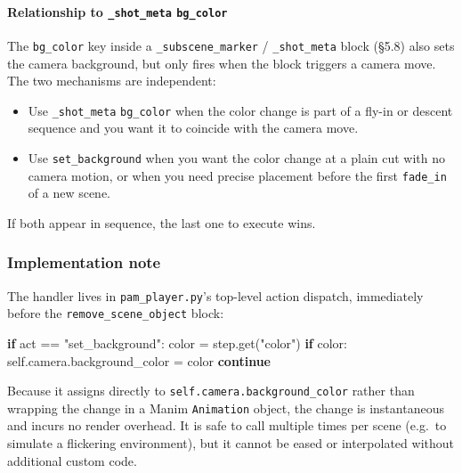 \documentclass[
  12pt,
  letterpaper,
]{book}
\newenvironment{Shaded}{}{}
\newcommand{\BuiltInTok}[1]{\textcolor[rgb]{0.00,0.50,0.00}{#1}}
\newcommand{\ControlFlowTok}[1]{\textcolor[rgb]{0.00,0.44,0.13}{\textbf{#1}}}
\newcommand{\NormalTok}[1]{#1}
\newcommand{\OperatorTok}[1]{\textcolor[rgb]{0.40,0.40,0.40}{#1}}
\newcommand{\StringTok}[1]{\textcolor[rgb]{0.25,0.44,0.63}{#1}}
\providecommand{\tightlist}{%
  \setlength{\itemsep}{0pt}\setlength{\parskip}{0pt}}
\begin{document}
\paragraph{Relationship to \texttt{\_shot\_meta}
\texttt{bg\_color}}\label{set-background-vs-shot-meta}

The \texttt{bg\_color} key inside a \texttt{\_subscene\_marker} /
\texttt{\_shot\_meta} block (§5.8) also sets the camera background,
but only fires when the block triggers a camera move. The two
mechanisms are independent:

\begin{itemize}
\tightlist
\item
  Use \texttt{\_shot\_meta} \texttt{bg\_color} when the color change
  is part of a fly-in or descent sequence and you want it to coincide
  with the camera move.
\item
  Use \texttt{set\_background} when you want the color change at a
  plain cut with no camera motion, or when you need precise placement
  before the first \texttt{fade\_in} of a new scene.
\end{itemize}

If both appear in sequence, the last one to execute wins.

\subsubsection{Implementation
note}\label{set-background-implementation}

The handler lives in \texttt{pam\_player.py}'s top-level action
dispatch, immediately before the \texttt{remove\_scene\_object} block:

\begin{Shaded}
\begin{Highlighting}[]
\ControlFlowTok{if} \BuiltInTok{act} \OperatorTok{==} \StringTok{"set\_background"}\NormalTok{:}
    \NormalTok{color }\OperatorTok{=} \NormalTok{step.get(}\StringTok{"color"}\NormalTok{)}
    \ControlFlowTok{if} \NormalTok{color:}
        \NormalTok{self.camera.background\_color }\OperatorTok{=} \NormalTok{color}
    \ControlFlowTok{continue}
\end{Highlighting}
\end{Shaded}

Because it assigns directly to \texttt{self.camera.background\_color}
rather than wrapping the change in a Manim \texttt{Animation} object,
the change is instantaneous and incurs no render overhead. It is safe
to call multiple times per scene (e.g.\ to simulate a flickering
environment), but it cannot be eased or interpolated without additional
custom code.
\end{document}
